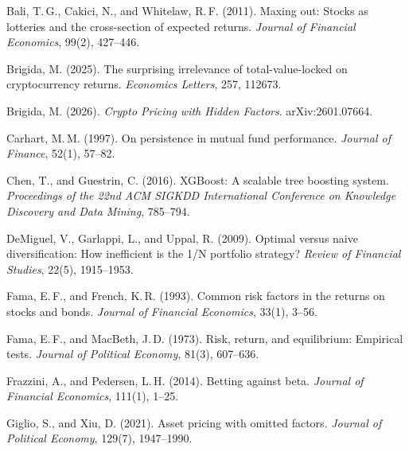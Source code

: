 \documentclass[11pt,a4paper]{article}
\begin{document}
\begin{flushleft}
\small
\begin{enumerate}[label={[\arabic*]},leftmargin=1.6em,itemsep=4pt]

\item \label{ref:bali-2011} Bali, T.\,G., Cakici, N., and Whitelaw, R.\,F. (2011). Maxing out: Stocks as lotteries and the cross-section of expected returns. \textit{Journal of Financial Economics}, 99(2), 427--446.

\item \label{ref:brigida-2025} Brigida, M. (2025). The surprising irrelevance of total-value-locked on cryptocurrency returns. \textit{Economics Letters}, 257, 112673.

\item \label{ref:brigida-2026} Brigida, M. (2026). \textit{Crypto Pricing with Hidden Factors}. arXiv:2601.07664.

\item \label{ref:carhart-1997} Carhart, M.\,M. (1997). On persistence in mutual fund performance. \textit{Journal of Finance}, 52(1), 57--82.

\item \label{ref:chen-guestrin-2016} Chen, T., and Guestrin, C. (2016). XGBoost: A scalable tree boosting system. \textit{Proceedings of the 22nd ACM SIGKDD International Conference on Knowledge Discovery and Data Mining}, 785--794.

\item \label{ref:demiguel-2009} DeMiguel, V., Garlappi, L., and Uppal, R. (2009). Optimal versus naive diversification: How inefficient is the 1/N portfolio strategy? \textit{Review of Financial Studies}, 22(5), 1915--1953.

\item \label{ref:fama-french-1993} Fama, E.\,F., and French, K.\,R. (1993). Common risk factors in the returns on stocks and bonds. \textit{Journal of Financial Economics}, 33(1), 3--56.

\item \label{ref:fama-macbeth-1973} Fama, E.\,F., and MacBeth, J.\,D. (1973). Risk, return, and equilibrium: Empirical tests. \textit{Journal of Political Economy}, 81(3), 607--636.

\item \label{ref:frazzini-pedersen-2014} Frazzini, A., and Pedersen, L.\,H. (2014). Betting against beta. \textit{Journal of Financial Economics}, 111(1), 1--25.

\item \label{ref:giglio-xiu-2021} Giglio, S., and Xiu, D. (2021). Asset pricing with omitted factors. \textit{Journal of Political Economy}, 129(7), 1947--1990.


\end{enumerate}
\end{flushleft}
\end{document}
